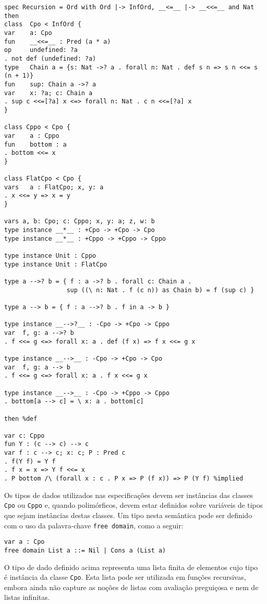 \begin{Verbatim}
spec Recursion = Ord with Ord |-> InfOrd, __<=__ |-> __<<=__ and Nat then
class  Cpo < InfOrd {
var    a: Cpo
fun    __<<=__ : Pred (a * a)
op     undefined: ?a
. not def (undefined: ?a)
type   Chain a = {s: Nat ->? a . forall n: Nat . def s n => s n <<= s (n + 1)}
fun    sup: Chain a ->? a
var    x: ?a; c: Chain a
. sup c <<=[?a] x <=> forall n: Nat . c n <<=[?a] x
}

class Cppo < Cpo {
var    a : Cppo
fun    bottom : a
. bottom <<= x
}

class FlatCpo < Cpo {
vars   a : FlatCpo; x, y: a
. x <<= y => x = y
}

vars a, b: Cpo; c: Cppo; x, y: a; z, w: b
type instance __*__ : +Cpo -> +Cpo -> Cpo
type instance __*__ : +Cppo -> +Cppo -> Cppo

type instance Unit : Cppo
type instance Unit : FlatCpo

type a -->? b = { f : a ->? b . forall c: Chain a .
                 sup ((\ n: Nat . f (c n)) as Chain b) = f (sup c) }

type a --> b = { f : a -->? b . f in a -> b }

type instance __-->?__ : -Cpo -> +Cpo -> Cppo
var  f, g: a -->? b
. f <<= g <=> forall x: a . def (f x) => f x <<= g x

type instance __-->__ : -Cpo -> +Cpo -> Cpo
var  f, g: a --> b
. f <<= g <=> forall x: a . f x <<= g x

type instance __-->__ : -Cpo -> +Cppo -> Cppo
. bottom[a --> c] = \ x: a . bottom[c]

then %def

var c: Cppo
fun Y : (c --> c) --> c
var f : c --> c; x: c; P : Pred c
. f(Y f) = Y f
. f x = x => Y f <<= x
. P bottom /\ (forall x : c . P x => P (f x)) => P (Y f) %implied
\end{Verbatim}

Os tipos de dados utilizados nas especificações devem ser instâncias das classes \Verb.Cpo. ou \Verb.Cppo. e, quando polimórficos, devem estar definidos sobre variáveis de tipos que sejam instâncias destas classes.
Um tipo nesta semântica pode ser definido com o uso da palavra-chave \Verb.free domain., como a seguir:

\begin{Verbatim}
var a : Cpo
free domain List a ::= Nil | Cons a (List a)
\end{Verbatim}

O tipo de dado definido acima representa uma lista finita de elementos cujo tipo é instância da classe \Verb.Cpo..
Esta lista pode ser utilizada em funções recursivas, embora ainda não capture as noções de listas com avaliação preguiçosa e nem de listas infinitas.


